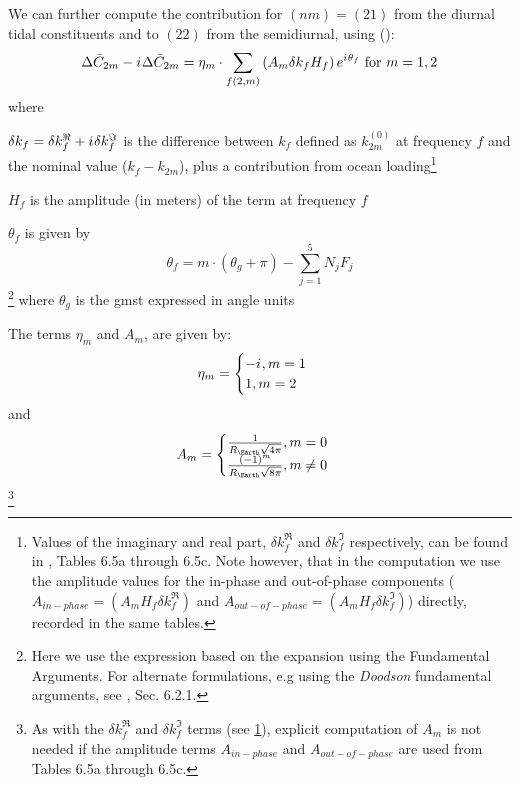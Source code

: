We can further compute the contribution for $(nm)=(21)$ from the 
diurnal tidal constituents and to $(22)$ from the semidiurnal, using 
(\cite{iers2010}):
\begin{equation}
  \Delta \bar{C}_{2m} - {i\mkern1mu} \Delta \bar{C}_{2m} = 
    \eta _m \cdot \sum _{f(2,m)} \left( A_m \delta k_f H_f\right) e^{{i\mkern1mu} \theta _f} 
    \text{ for } m=1,2
  \label{eq:iers1068b}
\end{equation}
where 
\begin{description}
  \item $\delta k_f = \delta k^\Re _f + {i\mkern1mu} \delta k^\Im _f$ is the difference 
  between $k_f$ defined as $k^{(0)}_{2m}$ at frequency $f$ and the 
  nominal value ($k_f - k_{2m}$), plus a contribution from ocean 
  loading\footnote{\label{fn:set-coefs}Values of the imaginary and real part, $\delta k^\Re _f$ and 
  $\delta k^\Im _f$ respectively, can be found in \cite{iers2010}, Tables 6.5a 
  through 6.5c. Note however, that in the computation we use the amplitude values 
  for the in-phase and out-of-phase components ($A_{in-phase} = \left(A_m H_f \delta k^\Re _f \right)$ 
  and $A_{out-of-phase} = \left( A_m H_f \delta k^\Im _f \right)$) directly, recorded 
  in the same tables.}
  \item $H_f$ is the amplitude (in meters) of the term at frequency $f$
  \item $\theta _f$ is given by 
  \begin{equation} \theta _f = m \cdot ( \theta _g + \pi ) - \sum ^5_{j=1} N_j F_j \end{equation}
  \footnote{Here we use the expression based on the expansion using the Fundamental 
  Arguments. For alternate formulations, e.g using the \emph{Doodson} fundamental 
  arguments, see \cite{iers2010}, Sec. 6.2.1.}
  where $\theta _g$ is the \gls{gmst} expressed in angle units

  \item The terms $\eta _m$ and $A_m$, are given by: 
  \begin{equation}
  \eta _m = 
    \begin{cases} -{i\mkern1mu} , m=1 \\ 1 , m=2\end{cases}
  \end{equation} and
  \begin{equation} 
    A_m = \begin{cases} 
        \frac{1}{R_{\Earth}\sqrt{4 \pi}}, m=0\\
        \frac{(-1)^m}{R_{\Earth}\sqrt{8 \pi}}, m \ne 0
    \end{cases}
  \end{equation}\footnote{As with the $\delta k^\Re _f$ and $\delta k^\Im _f$ terms 
  (see \ref{fn:set-coefs}), explicit computation of $A_m$ is not needed if the 
  amplitude terms $A_{in-phase}$ and $A_{out-of-phase}$ are used from 
  \cite{iers2010} Tables 6.5a through 6.5c.}
\end{description}


